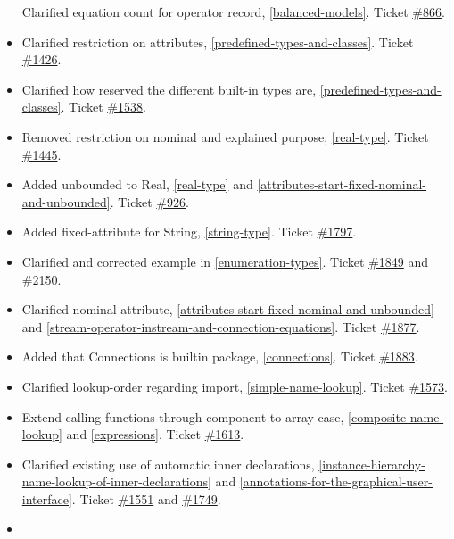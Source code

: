 \begin{itemize}
  Clarified equation count for operator record, \ref{balanced-models}. Ticket
  \href{https://trac.modelica.org/Modelica/ticket/866}{\#866}.
\item
  Clarified restriction on attributes, \ref{predefined-types-and-classes}. Ticket
  \href{https://trac.modelica.org/Modelica/ticket/1426}{\#1426}.
\item
  Clarified how reserved the different built-in types are, \ref{predefined-types-and-classes}.
  Ticket \href{https://trac.modelica.org/Modelica/ticket/1538}{\#1538}.
\item
  Removed restriction on nominal and explained purpose, \ref{real-type}.
  Ticket \href{https://trac.modelica.org/Modelica/ticket/1445}{\#1445}.
\item
  Added unbounded to Real, \ref{real-type} and \ref{attributes-start-fixed-nominal-and-unbounded}. Ticket
  \href{https://trac.modelica.org/Modelica/ticket/926}{\#926}.
\item
  Added fixed-attribute for String, \ref{string-type}. Ticket
  \href{https://trac.modelica.org/Modelica/ticket/1797}{\#1797}.
\item
  Clarified and corrected example in \ref{enumeration-types}. Ticket
  \href{https://trac.modelica.org/Modelica/ticket/1849}{\#1849} and
  \href{https://trac.modelica.org/Modelica/ticket/2150}{\#2150}.
\item
  Clarified nominal attribute, \ref{attributes-start-fixed-nominal-and-unbounded} 
  and \ref{stream-operator-instream-and-connection-equations}. Ticket
  \href{https://trac.modelica.org/Modelica/ticket/1877}{\#1877}.
\item
  Added that Connections is builtin package, \ref{connections}. Ticket
  \href{https://trac.modelica.org/Modelica/ticket/1883}{\#1883}.
\item
  Clarified lookup-order regarding import, \ref{simple-name-lookup}. Ticket
  \href{https://trac.modelica.org/Modelica/ticket/1573}{\#1573}.
\item
  Extend calling functions through component to array case, \ref{composite-name-lookup} and \ref{expressions}. Ticket
  \href{https://trac.modelica.org/Modelica/ticket/1613}{\#1613}.
\item
  Clarified existing use of automatic inner declarations, \ref{instance-hierarchy-name-lookup-of-inner-declarations}
  and \ref{annotations-for-the-graphical-user-interface}. Ticket
  \href{https://trac.modelica.org/Modelica/ticket/1551}{\#1551} and
  \href{https://trac.modelica.org/Modelica/ticket/1749}{\#1749}.
\item

\end{itemize}
